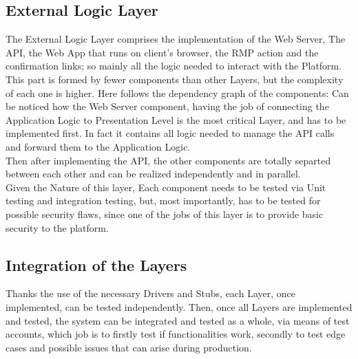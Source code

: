 \subsection{External Logic Layer}
The External Logic Layer comprises the implementation of the Web Server, The API, the Web App that runs on client's browser, the RMP action and the confirmation links; so mainly all the logic needed to interact with the Platform.\\
This part is formed by fewer components than other Layers, but the complexity of each one is higher. Here follows the dependency graph of the components:
Can be noticed how the Web Server component, having the job of connecting the Application Logic to Presentation Level is the most critical Layer, and has to be implemented first. In fact it contains all logic needed to manage the API calls and forward them to the Application Logic.\\
Then after implementing the API, the other components are totally separted between each other and can be realized independently and in parallel.\\   
Given the Nature of this layer, Each component needs to be tested via Unit testing and integration testing, but, most importantly, has to be tested for possible security flaws, since one of the jobs of this layer is to provide basic security to the platform. \\

\subsection{Integration of the Layers}
Thanks the use of the necessary Drivers and Stubs, each Layer, once implemented, can be tested independently. 
Then, once all Layers are implemented and tested, the system can be integrated and tested as a whole, via means of test accounts, which job is to firstly test if functionalities work, secondly to test edge cases and possible issues that can arise during production.\\